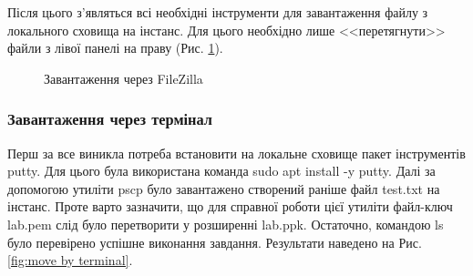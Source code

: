 \documentclass[a4paper,14pt]{extarticle}
\begin{document}
Після цього з'являться всі необхідні інструменти для завантаження файлу з локального 
сховища на інстанс. Для цього необхідно лише <<перетягнути>> файли з лівої панелі 
на праву (Рис. \ref{fig:move by FileZilla}).

\begin{figure}[h]
    \caption{Завантаження через FileZilla}
    \label{fig:move by FileZilla}
\end{figure}

\subsubsection*{Завантаження через термінал}

Перш за все виникла потреба встановити на локальне сховище 
пакет інструментів {\ttfamily putty}. Для цього була використана команда 
{\ttfamily sudo apt install -y putty}. Далі за допомогою утиліти {\ttfamily pscp} 
було завантажено створений раніше файл {\ttfamily test.txt} на інстанс. 
Проте варто зазначити, що для справної роботи цієї утиліти файл-ключ {\ttfamily lab.pem} 
слід було перетворити у розширенні {\ttfamily lab.ppk}. Остаточно, командою 
{\ttfamily ls} було перевірено успішне виконання завдання. Результати наведено на 
Рис. \ref{fig:move by terminal}.
\end{document}
